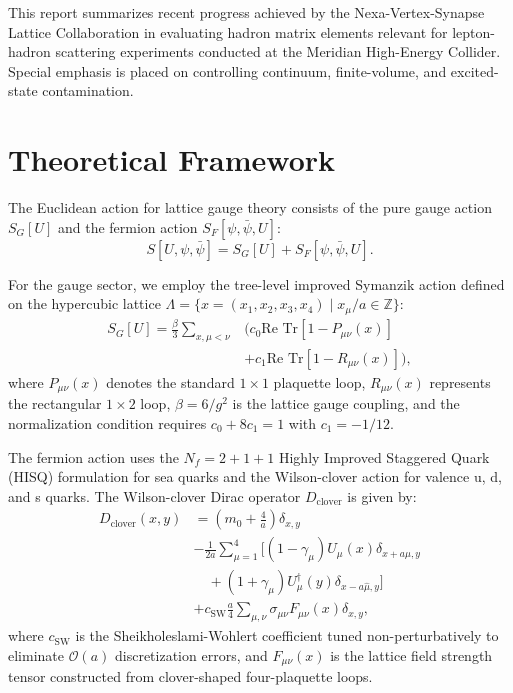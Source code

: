\documentclass{proc}
\begin{document}
This report summarizes recent progress achieved by the Nexa-Vertex-Synapse Lattice Collaboration in evaluating hadron matrix elements relevant for lepton-hadron scattering experiments conducted at the Meridian High-Energy Collider. Special emphasis is placed on controlling continuum, finite-volume, and excited-state contamination.

\section{Theoretical Framework}
The Euclidean action for lattice gauge theory consists of the pure gauge action $S_G[U]$ and the fermion action $S_F[\psi, \bar{\psi}, U]$:
\begin{equation}
S[U, \psi, \bar{\psi}] = S_G[U] + S_F[\psi, \bar{\psi}, U].
\end{equation}

For the gauge sector, we employ the tree-level improved Symanzik action defined on the hypercubic lattice $\Lambda = \{ x = (x_1, x_2, x_3, x_4) \mid x_\mu / a \in \mathbb{Z} \}$:
\begin{align}
S_G[U] = \frac{\beta}{3} \sum_{x, \mu < \nu} &\Big( c_0 \text{Re Tr}\left[ 1 - P_{\mu\nu}(x) \right] \nonumber \\
&+ c_1 \text{Re Tr}\left[ 1 - R_{\mu\nu}(x) \right] \Big),
\end{align}
where $P_{\mu\nu}(x)$ denotes the standard $1 \times 1$ plaquette loop, $R_{\mu\nu}(x)$ represents the rectangular $1 \times 2$ loop, $\beta = 6/g^2$ is the lattice gauge coupling, and the normalization condition requires $c_0 + 8c_1 = 1$ with $c_1 = -1/12$.

The fermion action uses the $N_f = 2+1+1$ Highly Improved Staggered Quark (HISQ) formulation for sea quarks and the Wilson-clover action for valence u, d, and s quarks. The Wilson-clover Dirac operator $D_{\text{clover}}$ is given by:
\begin{align}
D_{\text{clover}}(x, y) &= \left( m_0 + \frac{4}{a} \right) \delta_{x,y} \nonumber \\
&-\frac{1}{2a} \sum_{\mu=1}^4 \Big[ (1 - \gamma_\mu) U_\mu(x) \delta_{x+a\hat{\mu}, y} \nonumber \\
&\quad + (1 + \gamma_\mu) U_\mu^\dagger(y) \delta_{x-a\hat{\mu}, y} \Big] \nonumber \\
&+ c_{\text{SW}} \frac{a}{4} \sum_{\mu,\nu} \sigma_{\mu\nu} F_{\mu\nu}(x) \delta_{x,y},
\end{align}
where $c_{\text{SW}}$ is the Sheikholeslami-Wohlert coefficient tuned non-perturbatively to eliminate $\mathcal{O}(a)$ discretization errors, and $F_{\mu\nu}(x)$ is the lattice field strength tensor constructed from clover-shaped four-plaquette loops.
\end{document}
